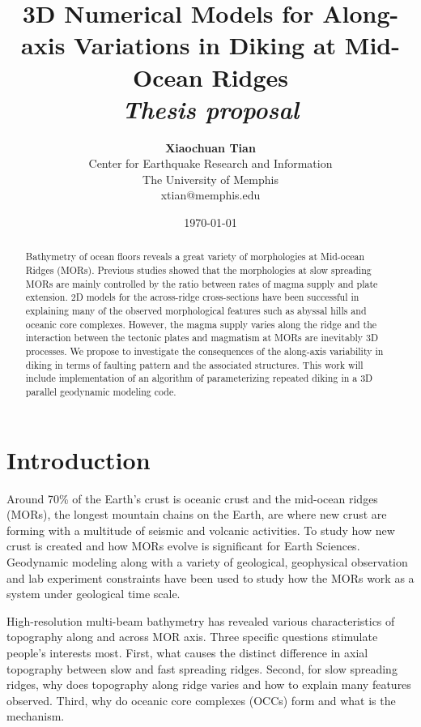 \documentclass[12pt]{article}
\title{{\bf 3D Numerical Models for Along-axis Variations in Diking at Mid-Ocean Ridges} \\
\it Thesis proposal}
\author{ {\bf Xiaochuan Tian}  \\
Center for Earthquake Research and Information \\
The University of Memphis\\
{\small xtian@memphis.edu}
}
\date{\today}
\begin{document}
\pagestyle{plain}
\maketitle

\pagebreak
\begin{abstract}

Bathymetry of ocean floors reveals a great variety of morphologies at Mid-ocean Ridges (MORs). Previous studies showed that the morphologies at slow spreading MORs are mainly controlled by the ratio between rates of magma supply and plate extension. 2D models for the across-ridge cross-sections have been successful in explaining many of the observed morphological features such as abyssal hills and oceanic core complexes. However, the magma supply varies along the ridge and the interaction between the tectonic plates and magmatism at MORs are inevitably 3D processes. We propose to investigate the consequences of the along-axis variability in diking in terms of faulting pattern and the associated structures. This work will include implementation of an algorithm of parameterizing repeated diking in a 3D parallel geodynamic modeling code.

\end{abstract}

\pagebreak
\tableofcontents
\pagebreak

\cleardoublepage
{}

\section{Introduction}
\label{ch:intro}

Around 70\% of the Earth's crust is oceanic crust and the mid-ocean ridges (MORs), the longest mountain chains on the Earth, are where new crust are forming with a multitude of seismic and volcanic activities. To study how new crust is created and how MORs evolve is significant for Earth Sciences.  Geodynamic modeling along with a variety of geological, geophysical observation and lab experiment constraints have been used to study how the MORs work as a system under geological time scale.

High-resolution multi-beam bathymetry has revealed various characteristics of topography along and across MOR axis. Three specific questions stimulate people's interests most. First, what causes the distinct difference in axial topography between slow and fast spreading ridges. Second, for slow spreading ridges, why does topography along ridge varies and how to explain many features observed. Third, why do oceanic core complexes (OCCs) form and what is the mechanism. 
\end{document}
